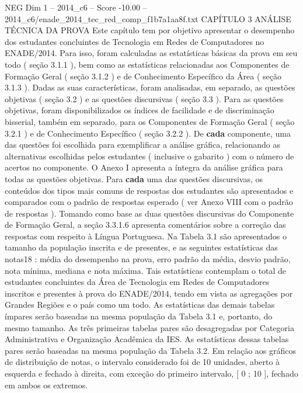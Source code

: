\begin{textsample}{NEG Dim 1 – 2014\_c6 – Score -10.00 – 2014\_c6/enade\_2014\_tec\_red\_comp\_f1b7a1aa8f.txt}  \label{ex:f1_neg_005}
CAPÍTULO 3 ANÁLISE TÉCNICA DA PROVA Este capítulo tem por objetivo apresentar o desempenho dos estudantes concluintes de Tecnologia em Redes de Computadores no ENADE/2014.
Para isso, foram calculadas as estatísticas básicas da prova em seu todo ( seção 3.1.1 ), bem como as estatísticas relacionadas aos Componentes de Formação Geral ( seção 3.1.2 ) e de Conhecimento Específico da Área ( seção 3.1.3 ).
Dadas as suas características, foram analisadas, em separado, as questões objetivas ( seção 3.2 ) e as questões discursivas ( seção 3.3 ).
Para as questões objetivas, foram disponibilizados os índices de facilidade e de discriminação bisserial, também em separado, para os Componentes de Formação Geral ( seção 3.2.1 ) e de Conhecimento Específico ( seção 3.2.2 ).
De \textbf{cada} componente, uma das questões foi escolhida para exemplificar a análise gráfica, relacionando as alternativas escolhidas pelos estudantes ( inclusive o gabarito ) com o número de acertos no componente.
O Anexo I apresenta a íntegra da análise gráfica para todas as questões objetivas.
Para \textbf{cada} uma das questões discursivas, os conteúdos dos tipos mais comuns de respostas dos estudantes são apresentados e comparados com o padrão de respostas esperado ( ver Anexo VIII com o padrão de respostas ).
Tomando como base as duas questões discursivas do Componente de Formação Geral, a seção 3.3.1.6 apresenta comentários sobre a correção das respostas com respeito à Língua Portuguesa.
Na Tabela 3.1 são apresentados o tamanho da população inscrita e de presentes, e as seguintes estatísticas das notas18 : média do desempenho na prova, erro padrão da média, desvio padrão, nota mínima, mediana e nota máxima.
Tais estatísticas contemplam o total de estudantes concluintes da Área de Tecnologia em Redes de Computadores inscritos e presentes à prova do ENADE/2014, tendo em vista as agregações por Grandes Regiões e o país como um todo.
As estatísticas das demais tabelas ímpares serão baseadas na mesma população da Tabela 3.1 e, portanto, do mesmo tamanho.
As três primeiras tabelas pares são desagregadas por Categoria Administrativa e Organização Acadêmica da IES.
As estatísticas dessas tabelas pares serão baseadas na mesma população da Tabela 3.2.
Em relação aos gráficos de distribuição de notas, o intervalo considerado foi de 10 unidades, aberto à esquerda e fechado à direita, com exceção do primeiro intervalo, [ 0 ; 10 ], fechado em ambos os extremos.

\end{textsample}
